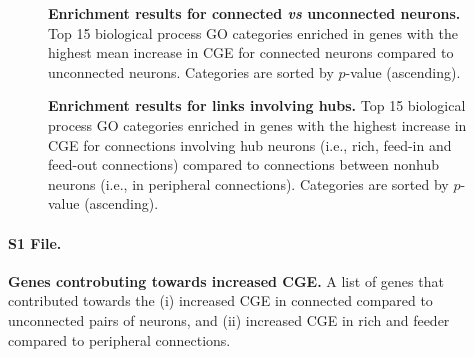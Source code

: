 \begin{figure}[h!]
   \caption{{\bf Enrichment results for connected \textit{vs} unconnected neurons.} Top 15 biological process GO categories enriched in genes with the highest mean increase in CGE for connected neurons compared to unconnected neurons.
Categories are sorted by $p$-value (ascending).}
\label{tab:enrichmentCON}
\end{figure}

\begin{figure}[h!]
   \caption{{\bf Enrichment results for links involving hubs.} Top 15 biological process GO categories enriched in genes with the highest increase in CGE for connections involving hub neurons (i.e., rich, feed-in and feed-out connections) compared to connections between nonhub neurons (i.e., in peripheral connections).
Categories are sorted by $p$-value (ascending).}
\label{tab:enrichmentRICH}
\end{figure}

\paragraph*{S1 File.}
\label{file:geneList}
{\bf Genes controbuting towards increased CGE.}
A list of genes that contributed towards the (i) increased CGE in connected compared to unconnected pairs of neurons, and (ii) increased CGE in rich and feeder compared to peripheral connections. 








